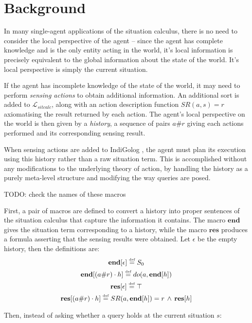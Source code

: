 \section{Background}

In many single-agent applications of the situation calculus, there
is no need to consider the local perspective of the agent -- since
the agent has complete knowledge and is the only entity acting in
the world, it's local information is precisely equivalent to the global
information about the state of the world. It's local perspective is
simply the current situation.

If the agent has incomplete knowledge of the state of the world, it
may need to perform \emph{sensing actions} to obtain additional information.
An additional sort is added to $\mathcal{L}_{sitcalc}$,
along with an action description function $SR(a,s)=r$ axiomatising
the result returned by each action. The agent's local perspective
on the world is then given by a \emph{history}, a sequence of pairs
$a\#r$ giving each actions performed and its corresponding sensing
result.

When sensing actions are added to IndiGolog \citep{giacomo99indigolog},
the agent must plan its execution using this history rather than a
raw situation term. This is accomplished without any modifications
to the underlying theory of action, by handling the history as a purely
meta-level structure and modifying the way queries are posed.

TODO: check the names of these macros

First, a pair of macros are defined to convert a history into proper
sentences of the situation calculus that capture the information it
contains. The macro $\mathbf{end}$ gives the situation term corresponding
to a history, while the macro $\mathbf{res}$ produces a formula asserting
that the sensing results were obtained. Let $\epsilon$ be the empty
history, then the definitions are:\begin{gather*}
\mathbf{end}[\epsilon]\stackrel{\mbox{\tiny def}}{=} S_{0}\\
\mathbf{end}[(a\#r)\cdot h]\stackrel{\mbox{\tiny def}}{=} do(a,\mathbf{end}[h])\\
\mathbf{res}[\epsilon]\stackrel{\mbox{\tiny def}}{=}\top\\
\mathbf{res}[(a\#r)\cdot h]\stackrel{\mbox{\tiny def}}{=} SR(a,\mathbf{end}[h])=r\,\wedge\,\mathbf{res}[h]\end{gather*}


Then, instead of asking whether a query holds at the current situation
$s$:


